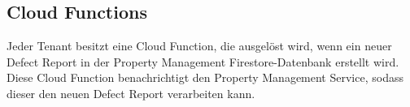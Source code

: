\subsection{Cloud Functions}
Jeder Tenant besitzt eine Cloud Function, die ausgelöst wird, wenn ein neuer Defect Report in der Property Management Firestore-Datenbank erstellt wird. Diese Cloud Function benachrichtigt den Property Management Service, sodass dieser den neuen Defect Report verarbeiten kann.

